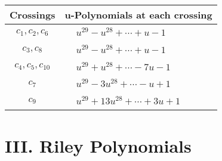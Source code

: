 \documentclass[1p]{elsarticle_modified}
\theoremstyle{definition}
\begin{document}
\begin{tabular}{m{50pt}|m{274pt}}
Crossings & \hspace{64pt}u-Polynomials at each crossing \\
\hline $$\begin{aligned}c_{1},c_{2},c_{6}\end{aligned}$$&$\begin{aligned}
&u^{29}- u^{28}+\cdots+u-1
\end{aligned}$\\
\hline $$\begin{aligned}c_{3},c_{8}\end{aligned}$$&$\begin{aligned}
&u^{29}- u^{28}+\cdots+u-1
\end{aligned}$\\
\hline $$\begin{aligned}c_{4},c_{5},c_{10}\end{aligned}$$&$\begin{aligned}
&u^{29}+u^{28}+\cdots-7 u-1
\end{aligned}$\\
\hline $$\begin{aligned}c_{7}\end{aligned}$$&$\begin{aligned}
&u^{29}-3 u^{28}+\cdots- u+1
\end{aligned}$\\
\hline $$\begin{aligned}c_{9}\end{aligned}$$&$\begin{aligned}
&u^{29}+13 u^{28}+\cdots+3 u+1
\end{aligned}$\\
\hline
\end{tabular}\newpage\renewcommand{\arraystretch}{1}
\centering \section*{ III. Riley Polynomials}
\end{document}
